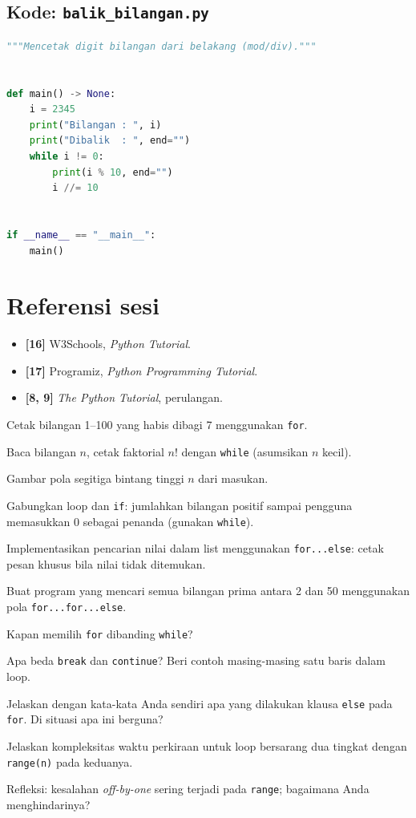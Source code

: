 ﻿\documentclass[../main.tex]{subfiles}
\begin{document}
\subsection{Kode: \texttt{balik\_bilangan.py}}
\begin{lstlisting}[language=Python,caption={\texttt{balik\_bilangan.py}}]
"""Mencetak digit bilangan dari belakang (mod/div)."""


def main() -> None:
    i = 2345
    print("Bilangan : ", i)
    print("Dibalik  : ", end="")
    while i != 0:
        print(i % 10, end="")
        i //= 10


if __name__ == "__main__":
    main()
\end{lstlisting}

\section{Referensi sesi}

\begin{itemize}[leftmargin=*]
  \item \textbf{[16]} W3Schools, \textit{Python Tutorial}.
  \item \textbf{[17]} Programiz, \textit{Python Programming Tutorial}.
  \item \textbf{[8, 9]} \textit{The Python Tutorial}, perulangan.
\end{itemize}

\begin{aktivitas}
  \item Cetak bilangan 1--100 yang habis dibagi 7 menggunakan \texttt{for}.
  \item Baca bilangan $n$, cetak faktorial $n!$ dengan \texttt{while} (asumsikan $n$ kecil).
  \item Gambar pola segitiga bintang tinggi $n$ dari masukan.
  \item Gabungkan loop dan \texttt{if}: jumlahkan bilangan positif sampai pengguna memasukkan 0 sebagai penanda (gunakan \texttt{while}).
  \item Implementasikan pencarian nilai dalam list menggunakan \texttt{for...else}: cetak pesan khusus bila nilai tidak ditemukan.
  \item Buat program yang mencari semua bilangan prima antara 2 dan 50 menggunakan pola \texttt{for...for...else}.
\end{aktivitas}

\begin{latihan}
  \item Kapan memilih \texttt{for} dibanding \texttt{while}?
  \item Apa beda \texttt{break} dan \texttt{continue}? Beri contoh masing-masing satu baris dalam loop.
  \item Jelaskan dengan kata-kata Anda sendiri apa yang dilakukan klausa \texttt{else} pada \texttt{for}. Di situasi apa ini berguna?
  \item Jelaskan kompleksitas waktu perkiraan untuk loop bersarang dua tingkat dengan \texttt{range(n)} pada keduanya.
  \item Refleksi: kesalahan \textit{off-by-one} sering terjadi pada \texttt{range}; bagaimana Anda menghindarinya?
\end{latihan}
\end{document}
